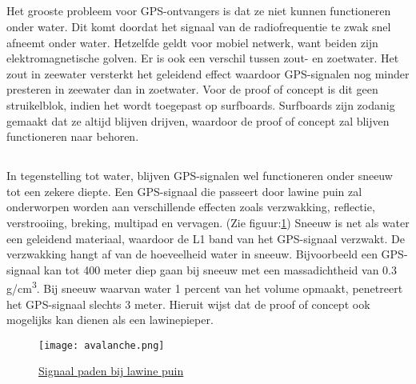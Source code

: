 \subsection{}
Het grooste probleem voor GPS-ontvangers is dat ze niet kunnen functioneren onder water. Dit komt doordat het signaal van de radiofrequentie te zwak snel afneemt onder water. Hetzelfde geldt voor mobiel netwerk, want beiden zijn elektromagnetische golven. \autocite{underwater} Er is ook een verschil tussen zout- en zoetwater. Het zout in zeewater versterkt het geleidend effect waardoor GPS-signalen nog minder presteren in zeewater dan in zoetwater. Voor de proof of concept is dit geen struikelblok, indien het wordt toegepast op surfboards. Surfboards zijn zodanig gemaakt dat ze altijd blijven drijven, waardoor de proof of concept zal blijven functioneren naar behoren.
\subsection{}
In tegenstelling tot water, blijven GPS-signalen wel functioneren onder sneeuw tot een zekere diepte. Een GPS-signaal die passeert door lawine puin zal onderworpen worden aan verschillende effecten zoals verzwakking, reflectie, verstrooiing, breking, multipad en vervagen. (Zie figuur:\ref{fig:avalanche}) Sneeuw is net als water een geleidend materiaal, waardoor de L1 band van het GPS-signaal verzwakt. De verzwakking hangt af van de hoeveelheid water in sneeuw. Bijvoorbeeld een GPS-signaal kan tot 400 meter diep gaan bij sneeuw met een massadichtheid van 0.3 g/cm\textsuperscript{3}. Bij sneeuw waarvan water 1 percent van het volume opmaakt, penetreert het GPS-signaal slechts 3 meter.
\autocite{avalanche_gps} Hieruit wijst dat de proof of concept ook mogelijks kan dienen als een lawinepieper. 
\begin{figure}
    \texttt{[image: avalanche.png]}
    \caption{\href{https://www.researchgate.net/figure/Signal-Paths-in-Avalanche-Debris_fig1_253280455}{Signaal paden bij lawine puin}}
    \label{fig:avalanche}
\end{figure}
\pagebreak

